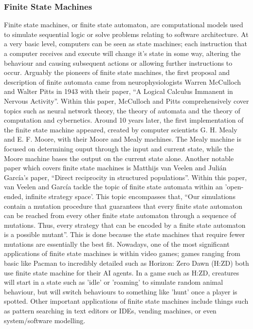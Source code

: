 \documentclass[12pt,a4paper]{article}
\begin{document}
\subsubsection{Finite State Machines}
Finite state machines, or finite state automaton, are computational models used to simulate sequential logic or solve problems relating to software architecture. At a very basic level, computers can be seen as state machines; each instruction that a computer receives and execute will change it's state in some way, altering the behaviour and causing subsequent actions or allowing further instructions to occur. Arguably the pioneers of finite state machines, the first proposal and description of finite automata came from neurophysiologists Warren McCulloch and Walter Pitts in 1943 with their paper, “A Logical Calculus Immanent in Nervous Activity”\cite{21}. Within this paper, McCulloch and Pitts comprehensively cover topics such as neural network theory, the theory of automata and the theory of computation and cybernetics. Around 10 years later, the first implementation of the finite state machine appeared, created by computer scientists G. H. Mealy and E. F. Moore, with their Moore and Mealy machines. The Mealy machine is focused on determining ouput through the input and current state, while the Moore machine bases the output on the current state alone. Another notable paper which covers finite state machines is Matthijs van Veelen and Julián García's paper, “Direct reciprocity in structured populations”\cite{34}. Within this paper, van Veelen and García tackle the topic of finite state automata within an 'open-ended, infinite strategy space'. This topic encompasses that, “Our simulations contain a mutation procedure that guarantees that every finite state automaton can be reached from every other finite state automaton through a sequence of mutations. Thus, every strategy that can be encoded by a finite state automaton is a possible mutant”\cite[p.~9929]{34}. This is done because the state machines that require fewer mutations are essentially the best fit. Nowadays, one of the most significant applications of finite state machines is within video games; games ranging from basic like Pacman to incredibly detailed such as Horizon: Zero Dawn (H:ZD) both use finite state machine for their AI agents. In a game such as H:ZD, creatures will start in a state such as 'idle' or 'roaming' to simulate random animal behaviour, but will switch behaviours to something like 'hunt' once a player is spotted. Other important applications of finite state machines include things such as pattern searching in text editors or IDEs, vending machines, or even system/software modelling. \\
\end{document}
